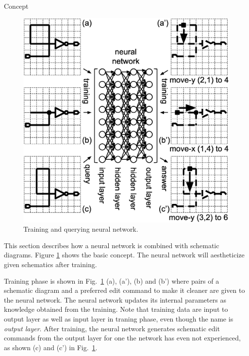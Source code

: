 \documentclass[twocolumn]{article}
\makeatletter
\def\section{\@startsection {section}{1}{\z@}{20pt plus 2pt minus 2pt}
{8pt plus 2pt minus 2pt}{\centering\normalsize\sc
\edef\@svsec{\thesection.\ }}}
\def\thesection{\Roman{section}}
\makeatother
\begin{document}
\section{Concept}

\begin{figure}[!tp]
 \begin{center}
  \begin{minipage}{\hsize}
   \includegraphics[width=\hsize]{fig/nn_schem_05.eps}
   \caption{Training and querying neural network.}
   \label{fig:nn_schem}
  \end{minipage}
 \end{center}
\end{figure}

This section describes how a neural network is
combined with schematic diagrams.
Figure \ref{fig:nn_schem} shows the basic concept.
The neural network will aestheticize given schematics after training.

Training phase is shown in Fig.\ \ref{fig:nn_schem} (a), (a'), (b) and (b')
where pairs of a schematic diagram and a preferred edit command
to make it cleaner are given to the neural network.
The neural network updates its internal parameters as knowledge obtained
from the training.
Note that training data are input to output layer
as well as input layer in traning phase,
even though the name is {\it output layer}.
After training, the neural network generates schematic edit commands
from the output layer for one the network has even not experienced,
as shown (c) and (c') in Fig.\ \ref{fig:nn_schem}.
\end{document}
